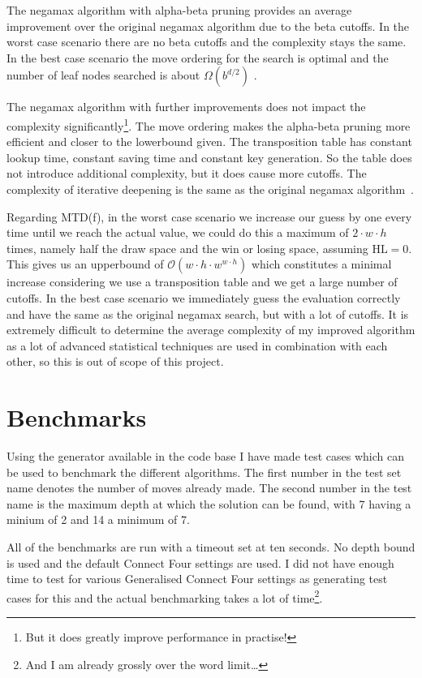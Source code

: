 \documentclass[a4paper]{article}
\begin{document}
The negamax algorithm with alpha-beta pruning provides an average improvement
over the original negamax algorithm due to the beta cutoffs. In the worst case
scenario there are no beta cutoffs and the complexity stays the same. In the
best case scenario the move ordering for the search is optimal and the number
of leaf nodes searched is about $\Omega(b^{d / 2})$ \cite{wiki:alphabeta}.

The negamax algorithm with further improvements does not impact the complexity
significantly\footnote{But it does greatly improve performance in practise!}.
The move ordering makes the alpha-beta pruning more efficient and closer to the
lowerbound given. The transposition table has constant lookup time, constant
saving time and constant key generation. So the table does not introduce
additional complexity, but it does cause more cutoffs. The complexity of
iterative deepening is the same as the original negamax
algorithm~\cite{wiki:iterdeep}.

Regarding MTD(f), in the worst case scenario we increase our guess by one every
time until we reach the actual value, we could do this a maximum of $2 \cdot w
\cdot h$ times, namely half the draw space and the win or losing space,
assuming $\text{HL} = 0$. This gives us an upperbound of $\mathcal{O}(w \cdot h
\cdot w^{w \cdot h})$ which constitutes a minimal increase considering we use a
transposition table and we get a large number of cutoffs. In the best case
scenario we immediately guess the evaluation correctly and have the same as the
original negamax search, but with a lot of cutoffs. It is extremely difficult
to determine the average complexity of my improved algorithm as a lot of
advanced statistical techniques are used in combination with each other, so
this is out of scope of this project.

\section{Benchmarks}
Using the generator available in the code base I have made test cases which can
be used to benchmark the different algorithms. The first number in the test set
name denotes the number of moves already made. The second number in the test
name is the maximum depth at which the solution can be found, with 7 having a
minium of 2 and 14 a minimum of 7.

All of the benchmarks are run with a timeout set at ten seconds. No depth bound
is used and the default Connect Four settings are used. I did not have enough
time to test for various Generalised Connect Four settings as generating test
cases for this and the actual benchmarking takes a lot of time\footnote{And I
am already grossly over the word limit\dots}.
\end{document}
